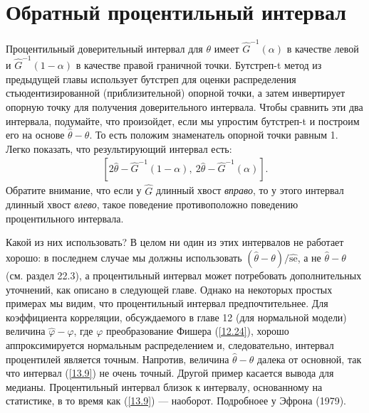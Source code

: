 \section{Обратный процентильный интервал}
Процентильный доверительный интервал для $\theta$ имеет $\widehat{G}^{-1}(\alpha)$ в качестве левой и $\widehat{G}^{-1}(1 - \alpha)$ в качестве правой граничной точки. Бутстреп-t метод из предыдущей главы использует бутстреп для оценки распределения стьюдентизированной (приблизительной) опорной точки, а затем инвертирует опорную точку для получения доверительного интервала. Чтобы сравнить эти два интервала, подумайте, что произойдет, если мы упростим  бутстреп-t и построим его на основе $\widehat{\theta} - \theta$. То есть положим знаменатель опорной точки равным 1. Легко показать, что результирующий интервал есть:
\begin{gather}\label{13.9}
[2\widehat{\theta} - \widehat{G}^{-1}(1 - \alpha),\ 2\widehat{\theta} - \widehat{G}^{-1}(\alpha)].
\end{gather}
Обратите внимание, что если у $\widehat{G}$ длинный хвост \textit{вправо}, то у этого интервал длинный хвост \textit{влево}, такое поведение противоположно поведению процентильного интервала. 

Какой из них использовать? В целом ни один из этих интервалов не работает хорошо: в последнем случае мы должны использовать $(\widehat{\theta} - \theta) /  \widehat{\text{se}}$, а не $\widehat{\theta} - \theta$ (см. раздел 22.3), а процентильный интервал может потребовать дополнительных уточнений, как описано в следующей главе. Однако на некоторых простых примерах мы видим, что процентильный интервал предпочтительнее. Для коэффициента корреляции, обсуждаемого в главе 12 (для нормальной модели) величина $\widehat{\varphi} - \varphi$, где $\varphi$ преобразование Фишера (\ref{12.24}), хорошо аппроксимируется нормальным распределением и, следовательно, интервал процентилей является точным. Напротив, величина $\widehat{\theta} - \theta$ далека от основной, так что интервал (\ref{13.9}) не очень точный. Другой пример касается вывода для медианы. Процентильный интервал близок к интервалу, основанному на статистике, в то время как (\ref{13.9}) --- наоборот. Подробноее у Эфрона (1979).